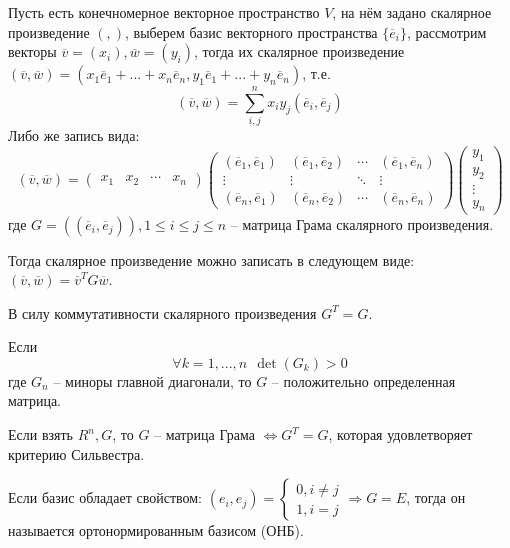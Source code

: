 	Пусть есть конечномерное векторное пространство $V$, на нём задано скалярное произведение $(,)$, выберем базис векторного пространства $\{\overline{e}_i\}$, рассмотрим векторы $\overline{v} = (x_i), \overline{w} = (y_i)$, 
	тогда их скалярное произведение $(\overline{v}, \overline{w}) = (x_1 \overline{e}_1 + ... + x_n \overline{e}_n, y_1 \overline{e}_1 + ... + y_n\overline{e}_n)$, т.е.
	$$(\overline{v}, \overline{w}) = \sum_{i, j}^n x_i y_j (\overline{e}_i, \overline{e}_j)$$
	Либо же запись вида:
	\[(\overline{v}, \overline{w}) = \left(\begin{array}{cccc}
	  x_1 & x_2 & \cdots & x_n
	  \end{array}\right)
	   \left(\begin{array}{cccc}
	  (\overline{e}_1, \overline{e}_1) & (\overline{e}_1, \overline{e}_2) & \cdots & (\overline{e}_1, \overline{e}_n) \\ 
	  \vdots & \vdots & \ddots & \vdots \\
	  (\overline{e}_n, \overline{e}_1) & (\overline{e}_n, \overline{e}_2) & \cdots & (\overline{e}_n, \overline{e}_n)
	  \end{array}\right) 
	  \left(\begin{array}{c}
		  y_1 \\ 
		  y_2 \\ 
		  \vdots \\ 
		  y_n
		  \end{array}\right)\] 
	  где $G = ((\overline{e}_i, \overline{e}_j)), {1 \leqslant i \leqslant j \leqslant n}$ -- матрица Грама скалярного произведения.
	  
	  Тогда скалярное произведение можно записать в следующем виде: $(\overline{v}, \overline{w}) = \overline{v}^T G \overline{w}$.
  
	  В силу коммутативности скалярного произведения $G^T = G$.
	  
	  \begin{Thm}
		Если
		 \[\forall k = 1,..., n \ \ \det(G_k) > 0\]
		 где $G_n$ -- миноры главной диагонали, то $G$ -- положительно определенная матрица. 
	  \end{Thm}
  
	  \begin{Prop}
		  Если взять $R^n, G$, то $G$ -- матрица Грама $\Leftrightarrow G^T = G$, которая удовлетворяет критерию Сильвестра.
	  \end{Prop}
  
	  \begin{Def}
		  Если базис обладает свойством:
		  $(e_i, e_j) = \begin{cases}
		  0, i \neq j\\
		  1, i = j
	  \end{cases} \Rightarrow G = E$,
	  тогда он называется ортонормированным базисом (ОНБ).
	  \end{Def} 
  
